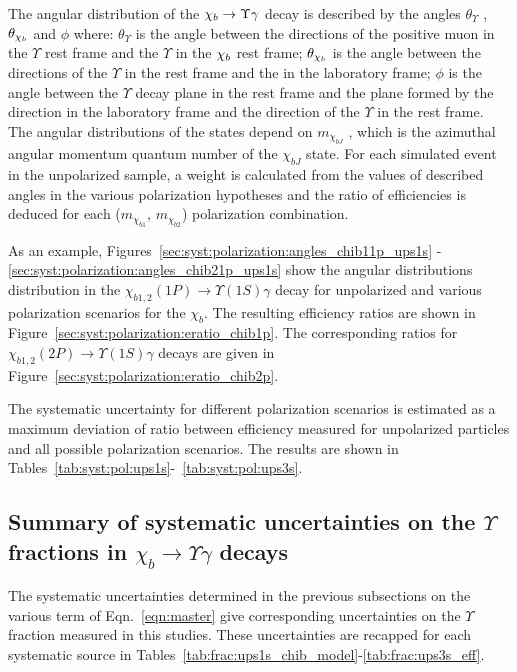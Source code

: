 The angular distribution of the $\chi_{b} \rightarrow \Upsilon \gamma$ decay is described
by the angles $\theta_{\Upsilon}$ , $\theta_{\chi_{b}}$ and $\phi$ where:
$\theta_{\Upsilon}$ is the angle between the directions of the positive muon in
the $\Upsilon$ rest frame and the $\Upsilon$ in the $\chi_{b}$ rest frame;
$\theta_{\chi_{b}}$ is the angle between the directions of the $\Upsilon$ in the
\chib rest frame and the \chib in the laboratory frame; $\phi$ is the angle
between the $\Upsilon$ decay plane in the \chib rest frame and the plane formed
by the \chib direction in the laboratory frame and the direction of the
$\Upsilon$ in the \chib rest frame. The angular distributions of the
\chib states depend on $m_{\chi_{bJ}}$ , which is the azimuthal angular
momentum quantum number of the $\chi_{bJ}$ state. For each simulated event in
the unpolarized sample, a weight is calculated from the values of described
angles in the various polarization hypotheses and the ratio of efficiencies is
deduced for each ($m_{\chi_{b1}}$, $m_{\chi_{b2}}$) polarization combination.

As an example, Figures~\ref{sec:syst:polarization:angles_chib11p_ups1s}
-\ref{sec:syst:polarization:angles_chib21p_ups1s} show the angular
distributions distribution in the $\chi_{b1,2}(1P) \to \Upsilon(1S) \gamma$
decay for unpolarized and various polarization scenarios for the $\chi_b$. The
resulting efficiency ratios are shown in
Figure~\ref{sec:syst:polarization:eratio_chib1p}. The corresponding ratios for
$\chi_{b1,2}(2P) \to \Upsilon(1S) \gamma$ decays are given in
Figure~\ref{sec:syst:polarization:eratio_chib2p}.






The systematic uncertainty for different polarization scenarios is estimated
as a maximum deviation of ratio between efficiency measured for unpolarized
particles and all possible polarization scenarios. The results  are
shown in Tables~\ref{tab:syst:pol:ups1s}-~\ref{tab:syst:pol:ups3s}.



\subsection{Summary of systematic uncertainties on the $\Upsilon$ fractions in $\chi_b \to \Upsilon \gamma$ decays}
The systematic uncertainties determined in the previous subsections on the
various term of Eqn.~\ref{eqn:master} give corresponding uncertainties on the
$\Upsilon$ fraction measured in this studies. These uncertainties are recapped
for each systematic source in
Tables~\ref{tab:frac:ups1s_chib_model}-\ref{tab:frac:ups3s_eff}.





